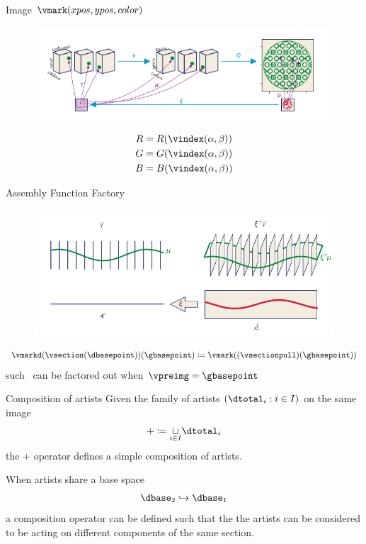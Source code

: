 \documentclass[xcolor={dvipsnames}, handout]{beamer}
\begin{document}
\begin{frame}{Image $\vmark(xpos, ypos, color)$}
    \begin{figure}[H]
        \includegraphics[width=1\textwidth]{figures/math/image.png}
    \end{figure}
    \begin{align*}
        R &= R(\vindex(\alpha, \beta))\\
        G &= G(\vindex(\alpha, \beta))\\
        B &= B(\vindex(\alpha, \beta))
    \end{align*}
\end{frame}

\begin{frame}{Assembly Function Factory}
\begin{figure}[H]
    \includegraphics[width=1\textwidth]{figures/math/q_hat.png}
\end{figure}
\begin{equation}\label{eq:qhat_q_s}
    \vmarkd(\vsection(\dbasepoint))(\gbasepoint) \coloneqq \vmark((\vsectionpull)(\gbasepoint))
\end{equation} 
such \gbasepoint\ can be factored out when $\vpreimg = \gbasepoint$
\end{frame}

\begin{frame}{Composition of artists}
    Given the family of artists $(\dtotal_i: i\in I)$ on the same image
    \begin{equation}
        + \coloneqq \underset{i\in I}{\sqcup} \dtotal_{i}
    \end{equation}
    the + operator defines a simple composition of artists. 

    When artists share a base space 
    \begin{equation}
        \dbase_2 \hookrightarrow \dbase_1
    \end{equation}
    a composition operator can be defined such that the the artists can be considered to be acting on different components of the same section. 
\end{frame}
\end{document}
